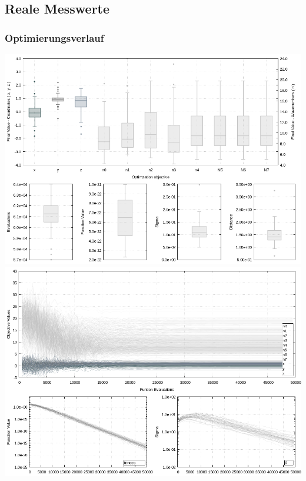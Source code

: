 \subsection{Reale Messwerte}
\begin{frame}
  \frametitle{Optimierungsverlauf}
  \begin{center}
  \includegraphics[width=.47\textwidth]{../img/boxes2089.png}
  \qquad
  \includegraphics[width=.47\textwidth]{../img/lines2089.png}
  \end{center}
\end{frame}
